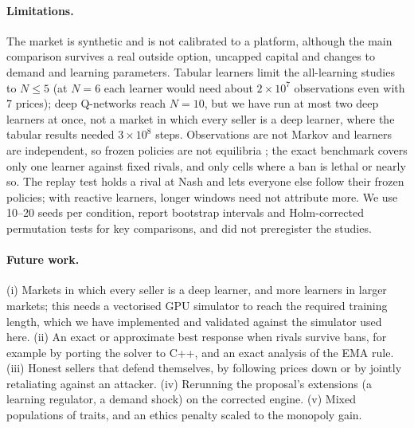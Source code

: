 \documentclass{article}
\begin{document}
\paragraph{Limitations.} The market is synthetic and is not calibrated to a platform, although the main comparison survives a real outside option, uncapped capital and changes to demand and learning parameters. Tabular learners limit the all-learning studies to $N\le5$ (at $N=6$ each learner would need about $2\times10^7$ observations even with 7 prices); deep Q-networks reach $N=10$, but we have run at most two deep learners at once, not a market in which every seller is a deep learner, where the tabular results needed $3\times10^8$ steps. Observations are not Markov and learners are independent, so frozen policies are not equilibria \citep{busoniu2008}; the exact benchmark covers only one learner against fixed rivals, and only cells where a ban is lethal or nearly so. The replay test holds a rival at Nash and lets everyone else follow their frozen policies; with reactive learners, longer windows need not attribute more. We use 10--20 seeds per condition, report bootstrap intervals and Holm-corrected permutation tests for key comparisons, and did not preregister the studies.

\paragraph{Future work.} (i) Markets in which every seller is a deep learner, and more learners in larger markets; this needs a vectorised GPU simulator to reach the required training length, which we have implemented and validated against the simulator used here. (ii) An exact or approximate best response when rivals survive bans, for example by porting the solver to C++, and an exact analysis of the EMA rule. (iii) Honest sellers that defend themselves, by following prices down or by jointly retaliating against an attacker. (iv) Rerunning the proposal's extensions (a learning regulator, a demand shock) on the corrected engine. (v) Mixed populations of traits, and an ethics penalty scaled to the monopoly gain.

\end{document}
